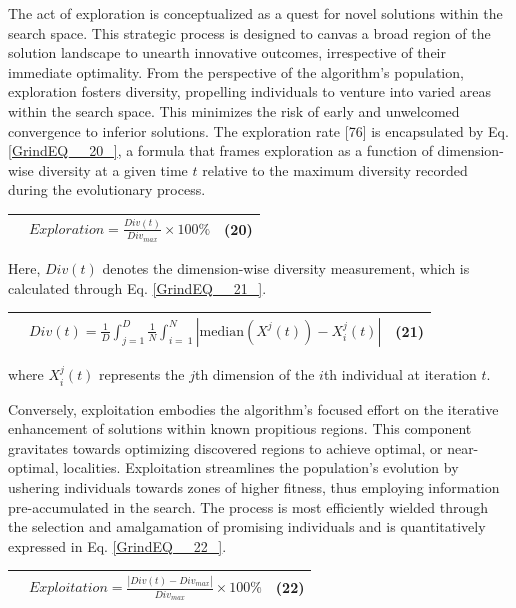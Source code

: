 \documentclass{article} %
\begin{document}
The act of exploration is conceptualized as a quest for novel solutions within the search space. This strategic process is designed to canvas a broad region of the solution landscape to unearth innovative outcomes, irrespective of their immediate optimality. From the perspective of the algorithm's population, exploration fosters diversity, propelling individuals to venture into varied areas within the search space. This minimizes the risk of early and unwelcomed convergence to inferior solutions. The exploration rate [76] is encapsulated by Eq. \eqref{GrindEQ__20_}, a formula that frames exploration as a function of dimension-wise diversity at a given time $t$ relative to the maximum diversity recorded during the evolutionary process.

\begin{tabular}{|p{0.4in}|p{2.9in}|p{0.5in}|} \hline 
 & $Exploration=\frac{Div\left(t\right)}{{Div}_{max}}\times 100\%$ & (20) \\ \hline 
\end{tabular}

Here, $Div(t)$ denotes the dimension-wise diversity measurement, which is calculated through Eq. \eqref{GrindEQ__21_}. 

\begin{tabular}{|p{0.4in}|p{2.9in}|p{0.5in}|} \hline 
 & $Div\left(t\right)=\frac{1}{D}\int^D_{j=1}{\frac{1}{N}\int^N_{i=\ 1}{\left|\mathrm{median}\left(X^j\left(t\right)\right)-X^j_i\left(t\right)\right|}}$ & (21) \\ \hline 
\end{tabular}

where $X^j_i\left(t\right)$ represents the $j$th dimension of the $i$th individual at iteration $t$.

 Conversely, exploitation embodies the algorithm's focused effort on the iterative enhancement of solutions within known propitious regions. This component gravitates towards optimizing discovered regions to achieve optimal, or near-optimal, localities. Exploitation streamlines the population's evolution by ushering individuals towards zones of higher fitness, thus employing information pre-accumulated in the search. The process is most efficiently wielded through the selection and amalgamation of promising individuals and is quantitatively expressed in Eq. \eqref{GrindEQ__22_}.

\begin{tabular}{|p{0.4in}|p{2.9in}|p{0.5in}|} \hline 
 & $Exploitation=\frac{\left|Div\left(t\right)-{Div}_{max}\right|}{{Div}_{max}}\times 100\%$ & (22) \\ \hline 
\end{tabular}
\end{document}
